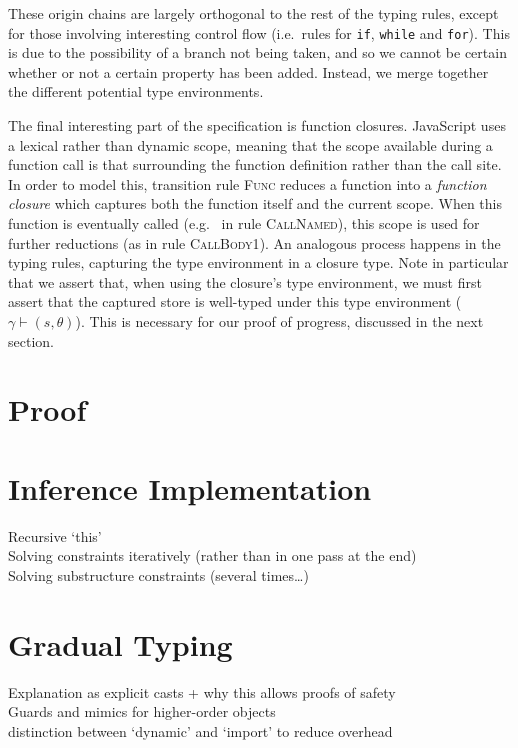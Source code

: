 \documentclass[12pt,a4paper,twoside,openright]{report}
\begin{document}
These origin chains are largely orthogonal to the rest of the typing rules,
except for those involving interesting control flow (i.e.~rules for
\texttt{if}, \texttt{while} and \texttt{for}). This is due to the possibility
of a branch not being taken, and so we cannot be certain whether or not a
certain property has been added. Instead, we merge together the different
potential type environments. 

The final interesting part of the specification is function closures.
JavaScript uses a lexical rather than dynamic scope, meaning that the scope
available during a function call is that surrounding the function definition
rather than the call site. In order to model this, transition rule
\textsc{Func} reduces a function into a \textit{function closure} which
captures both the function itself and the current scope. When this function is
eventually called (e.g.~ in rule \textsc{CallNamed}), this scope is used for
further reductions (as in rule \textsc{CallBody1}). An analogous process
happens in the typing rules, capturing the type environment in a closure type.
Note in particular that we assert that, when using the closure's type
environment, we must first assert that the captured store is well-typed under
this type environment ($\gamma \vdash (s, \theta)$). This is necessary for our
proof of progress, discussed in the next section.

\section{Proof}

\section{Inference Implementation}
Recursive `this' \\
Solving constraints iteratively (rather than in one pass at the end) \\
Solving substructure constraints (several times\ldots) \\

\section{Gradual Typing}
Explanation as explicit casts + why this allows proofs of safety \\
Guards and mimics for higher-order objects \\
distinction between `dynamic' and `import' to reduce overhead \\
\end{document}
